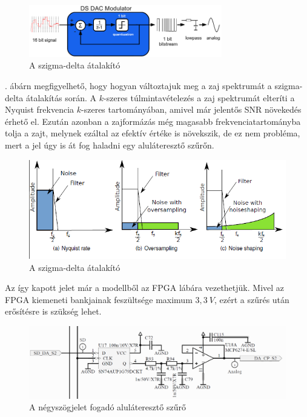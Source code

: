 \begin{figure}[!h]
	\centering
	\includegraphics[width = 0.75\textwidth]{figures/first_oder_sd.png}
	\caption{A szigma-delta átalakító} 
	\label{fig:sigmadelta}
\end{figure}


. ábárn megfigyelhető, hogy hogyan változtajuk meg a zaj spektrumát a szigma-delta átalakítás során. A $k$-szeres túlmintavételezés a zaj spektrumát elteríti a Nyquist frekvencia $k$-szeres tartományában, amivel már jelentős SNR növekedés érhető el. Ezután azonban a zajformázás még magasabb frekvenciatartományba tolja a zajt, melynek ezáltal az efektív értéke is növekszik, de ez nem probléma, mert a jel úgy is át fog haladni egy aluláteresztő szűrőn.

\begin{figure}[!h]
	\centering
	\includegraphics[width = \textwidth]{figures/noiseshape.png}
	\caption{A szigma-delta átalakító} 
	\label{fig:asd}
\end{figure}

Az így kapott jelet már a modellből az FPGA lábára vezethetjük. Mivel az FPGA kiemeneti bankjainak feszültsége maximum $3,3\ V$, ezért a szűrés után erősítésre is szükség lehet.

\begin{figure}[!h]
	\centering
	\includegraphics[width = \textwidth]{figures/lowpassfilter.png}
	\caption{A négyszögjelet fogadó aluláteresztő szűrő} 
	\label{fig:lowpass}
\end{figure}

